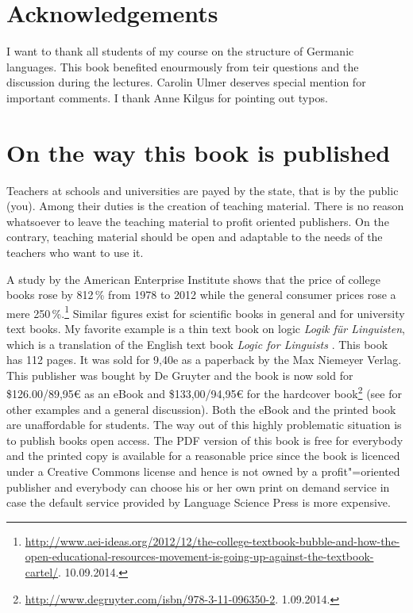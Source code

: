 \documentclass[ %
                ,series=tbls,
	        ,output=long    %
	        ,draftmode  
		  ]{langsci/langscibook}
\begin{document}
\section*{Acknowledgements}

I want to thank all students of my course on the structure of Germanic languages. This book
benefited enourmously from teir questions and the discussion during the lectures. 
Carolin Ulmer %
deserves special mention for important comments. I thank Anne
Kilgus for pointing out typos.


\section*{On the way this book is published}

Teachers at schools and universities are payed by the state, that is by the public (you). Among
their duties is the creation of teaching material. There is no reason whatsoever to leave the
teaching material to profit oriented publishers. On the contrary, teaching material should be open
and adaptable to the needs of the teachers who want to use it. 

A study by the American Enterprise Institute shows that the price of college books rose by 812\,\%
from 1978 to 2012 while the general consumer prices rose a mere 250\,\%.\footnote{
\url{http://www.aei-ideas.org/2012/12/the-college-textbook-bubble-and-how-the-open-educational-resources-movement-is-going-up-against-the-textbook-cartel/}.
10.09.2014.%
} Similar figures exist for scientific books in general and for university text books. My favorite example is a thin text book
on logic \emph{Logik für Linguisten}, which is a translation of the English text book \emph{Logic for
Linguists} \citep{AAD73a}. This book has 112 pages. It was sold for 9,40e as a paperback by the Max Niemeyer
Verlag. This publisher was bought by De Gruyter and the book is now sold for \$126.00/89,95€ as an
eBook and \$133,00/94,95€ for the hardcover book\footnote{
  \url{http://www.degruyter.com/isbn/978-3-11-096350-2}. 1.09.2014.
} (see \citealp{MuellerOA} for other examples and a general discussion). Both the eBook and the printed book are unaffordable for students. The way out of this highly
problematic situation is to publish books open access. The PDF version of this book is free for
everybody and the printed copy is available for a reasonable price since the book is licenced under
a Creative Commons license and hence is not owned by a
profit"=oriented publisher and everybody can choose his or her own print on demand service in case
the default service provided by Language Science Press is more expensive.
\end{document}
